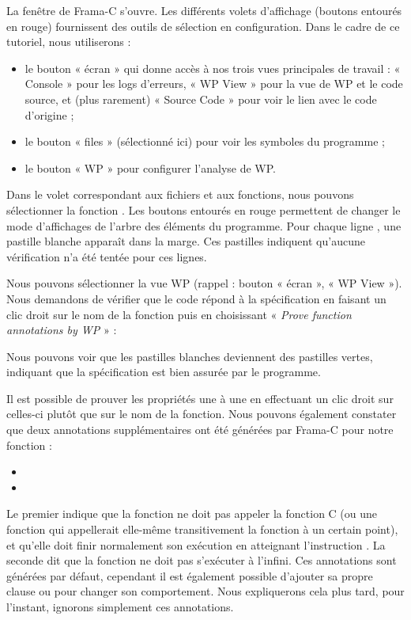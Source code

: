 La fenêtre de Frama-C s'ouvre. Les différents volets d'affichage (boutons
entourés en rouge) fournissent des outils de sélection en configuration. Dans
le cadre de ce tutoriel, nous utiliserons :
\begin{itemize}
  \item le bouton « écran » qui donne accès à nos trois vues principales de
        travail : « Console » pour les logs d'erreurs, « WP View » pour la vue
        de WP et le code source, et (plus rarement) « Source Code » pour voir
        le lien avec le code d'origine ;
  \item le bouton « files » (sélectionné ici) pour voir les symboles du programme ;
  \item le bouton « WP » pour configurer l'analyse de WP.
\end{itemize}
Dans le volet correspondant aux fichiers et aux
fonctions, nous pouvons sélectionner la fonction . Les boutons
entourés en rouge permettent de changer le mode d'affichages de l'arbre des
éléments du programme.
Pour chaque ligne , une pastille blanche apparaît dans la marge.
Ces pastilles indiquent qu'aucune vérification n'a été tentée pour ces lignes.



Nous pouvons sélectionner la vue WP (rappel : bouton « écran », « WP View »).
Nous demandons de vérifier que le code répond à la spécification en faisant
un clic droit sur le nom de la fonction puis en choisissant
« \textit{Prove function annotations by WP} » :




Nous pouvons voir que les pastilles blanches deviennent des pastilles vertes,
indiquant que la spécification est bien assurée par le programme.




Il est possible de prouver les propriétés une à une en effectuant un clic droit sur
celles-ci plutôt que sur le nom de la fonction. Nous pouvons également constater que deux
annotations supplémentaires ont été générées par Frama-C pour notre fonction :
\begin{itemize}
  \item {}
  \item {}
\end{itemize}
Le premier indique que la fonction ne doit pas appeler la fonction C
 (ou une fonction qui appellerait elle-même transitivement la
fonction  à un certain point), et qu'elle doit finir normalement
son exécution en atteignant l'instruction . La seconde dit
que la fonction ne doit pas s'exécuter à l'infini. Ces annotations sont générées
par défaut, cependant il est également possible d'ajouter sa propre clause
 ou  pour changer son comportement.
Nous expliquerons cela plus tard, pour l'instant, ignorons simplement ces
annotations.



